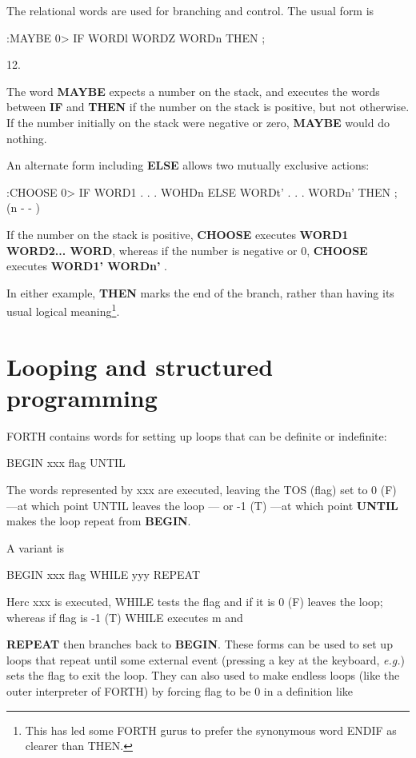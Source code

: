 The relational words are used for branching and control. The usual form is

:MAYBE 0> IF WORDl WORDZ
WORDn THEN ;

12.

The word \textbf{MAYBE} expects a number on the stack, and executes the words between \textbf{IF} and \textbf{THEN} if the number on the stack is positive, but not otherwise. If the number initially on the stack were negative or zero, \textbf{MAYBE} would do nothing.

An alternate form including \textbf{ELSE} allows two mutually exclusive actions:

:CHOOSE 0> IF WORD1 . . . WOHDn
ELSE WORDt' . . . WORDn'
THEN ; (n - - )

If the number on the stack is positive, \textbf{CHOOSE} executes \textbf{WORD1 WORD2... WORD}, whereas if the number is negative or 0, \textbf{CHOOSE} executes \textbf{WORD1' WORDn'} .

In either example, \textbf{THEN} marks the end of the branch, rather than having its usual logical meaning\footnote{This has led some FORTH gurus to prefer the synonymous word ENDIF as clearer than THEN.}.

\section{Looping and structured programming}

FORTH contains words for setting up loops that can be definite or indefinite:

BEGIN xxx ﬂag UNTIL

The words represented by xxx are executed, leaving the TOS (ﬂag) set to 0 (F) —at which point UNTIL leaves the loop — or -1 (T) —at which point \textbf{UNTIL} makes the loop repeat from \textbf{BEGIN}.

A variant is

BEGIN xxx ﬂag WHILE yyy REPEAT

Herc xxx is executed, WHILE tests the ﬂag and if it is 0 (F) leaves
the loop; whereas if flag is -1 (T) WHILE executes m and

\textbf{REPEAT} then branches back to \textbf{BEGIN}. These forms can be used to set up loops that repeat until some external event (pressing a key at the keyboard, \textit{\textit{e.g.}}) sets the ﬂag to exit the loop. They can also used to make endless loops (like the outer interpreter of FORTH) by forcing flag to be 0 in a definition like


